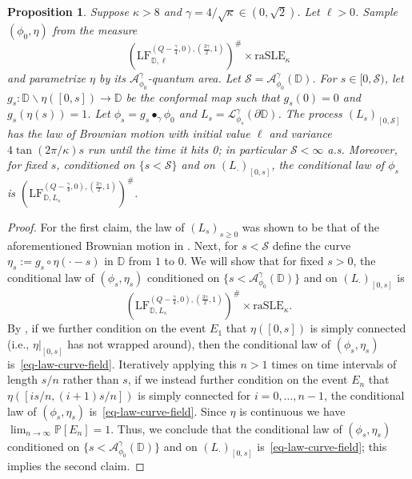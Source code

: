 \documentclass[a4paper]{article}
\numberwithin{equation}{section}
\newcommand{\eqb}{\begin{equation}}
\newcommand{\eqe}{\end{equation}}
\newcommand{\bbD}{\mathbb{D}}
\newcommand{\D}{\mathbb{D}}
\renewcommand{\P}{\mathbb{P}}
\newcommand{\cA}{\mathcal{A}}
\newcommand{\cL}{\mathcal{L}}
\newcommand{\qduration}{\mathcal{S}}
\newcommand{\LF}{\mathrm{LF}}
\newtheorem{proposition}[theorem]{Proposition}
\theoremstyle{remark}
\numberwithin{equation}{section}
\begin{document}
\begin{proposition}\label{prop-radial-mot-sf-finite}
Suppose $\kappa > 8$ and $\gamma = 4/\sqrt\kappa \in (0, \sqrt2)$. Let $\ell > 0$. Sample $(\phi_0,\eta)$ from the measure 
    \[
    (\LF_{\bbD,\ell}^{(Q-\frac{\gamma}{4},0),(\frac{3\gamma}{2},1)})^\#\times \mathrm{raSLE}_\kappa
    \]
    and parametrize $\eta$ by its $\cA^\gamma_{\phi_0}$-quantum area. Let $\qduration = \cA^\gamma_{\phi_0}(\D)$. For $s \in [0, \qduration)$, let $g_s:\bbD\backslash \eta([0,s])\to\bbD$ be the conformal map such that $g_s(0) = 0$ and $g_s(\eta(s))=1$. Let $\phi_s = g_s \bullet_\gamma \phi_0$ and $L_s = \cL_{\phi_s}^\gamma(\partial \D)$. The process $(L_s)_{[0,\qduration]}$ has the law of Brownian motion with initial value $\ell$ and variance $4 \tan (2\pi/\kappa) s$ run until the time it hits 0; in particular $\qduration < \infty$ a.s. Moreover, for fixed $s$, conditioned on $\{s < \qduration\}$ and on  $(L_\cdot)_{[0,s]}$, the conditional law of $\phi_s$ is  $(\LF_{\bbD, L_s}^{(Q-\frac{\gamma}{4},0),(\frac{3\gamma}{2},1)})^\#$.
\end{proposition}
\begin{proof}
For the first claim, the law of $(L_s)_{s \geq 0}$ was shown to be that of the aforementioned Brownian motion in \cite[Theorem 3.1]{ay-reversibility}.  
    Next, for $s < \qduration$ define the curve $\eta_s := g_s \circ \eta(\cdot - s)$ in $\D$ from $1$ to $0$. We will show that for fixed $s>0$, the conditional law of $(\phi_s, \eta_s)$ conditioned on $\{s < \cA^\gamma_{\phi_0}(\D)\}$ and on  $(L_\cdot)_{[0,s]}$ is
    \eqb\label{eq-law-curve-field}
(\LF_{\bbD, L_s}^{(Q-\frac{\gamma}{4},0),(\frac{3\gamma}{2},1)})^\# \times \mathrm{raSLE}_\kappa.
    \eqe
    By \cite[Corollary 3.13]{ay-reversibility}, if we further condition on the event $E_1$ that $\eta([0,s])$ is simply connected (i.e., $\eta|_{[0,s]}$ has not wrapped around), then the conditional law of $(\phi_s, \eta_s)$ is~\eqref{eq-law-curve-field}. Iteratively applying this $n>1$ times on time intervals of length $s/n$ rather than $s$, if we instead further condition on the event $E_n$ that $\eta([is/n, (i+1)s/n])$ is simply connected for $i = 0, \dots, n-1$, the conditional law of $(\phi_s, \eta_s)$ is~\eqref{eq-law-curve-field}. Since $\eta$ is continuous we have $\lim_{n\to\infty}\P[E_n] = 1$. Thus, we conclude that the conditional law of $(\phi_s, \eta_s)$ conditioned on $\{s < \cA^\gamma_{\phi_0}(\D)\}$ and on  $(L_\cdot)_{[0,s]}$ is~\eqref{eq-law-curve-field}; this implies the second claim. 
\end{proof}
\end{document}
